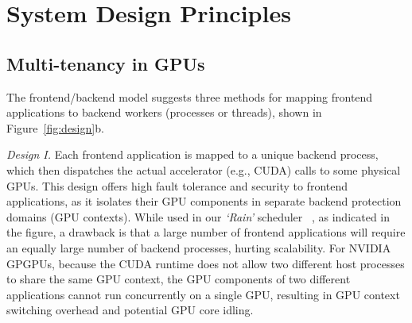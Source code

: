\section{System Design Principles}
\label{design1}

\subsection{Multi-tenancy in GPUs}
The frontend/backend model suggests three methods for mapping frontend applications to backend workers (processes or threads), shown in Figure~\ref{fig:design}b.

\textit{Design I.} Each frontend application is mapped to a unique backend process, which then dispatches the actual accelerator (e.g., CUDA) calls to some physical GPUs. This design offers high fault tolerance and security to frontend applications, as it isolates their GPU components in separate backend protection domains (GPU contexts). While used in our  \textit{‘Rain’} scheduler ~\cite{Rain}, as indicated in the figure, a drawback is that a large number of frontend applications will require an equally large number of backend processes, hurting scalability. For NVIDIA GPGPUs, because the CUDA runtime does not allow two different host processes to share the same GPU context, the GPU components of two different applications cannot run concurrently on a single GPU, resulting in GPU context switching overhead and potential GPU core idling.

